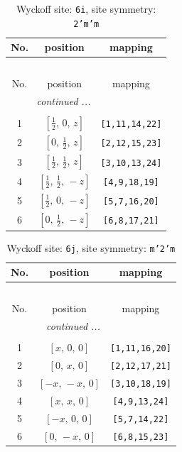 \documentclass[fleqn,8pt]{jsarticle}
\begin{document}
\renewcommand{\arraystretch}{1.2}
\begin{longtable}{ccc}
\caption{Wyckoff site: {\tt 6i}, site symmetry: {\tt 2'm'm}}
 \\
 \hline \hline
No. & position & mapping \\ \hline \endfirsthead

\multicolumn{2}{l}{\tablename\ \thetable{}} \\
 \hline \hline
No. & position & mapping \\ \hline \endhead

 \hline \hline
\multicolumn{2}{r}{\footnotesize\it continued ...} \\ \endfoot

 \hline \hline
\multicolumn{2}{r}{} \\ \endlastfoot

1 & $\left[ \frac{1}{2},\, 0,\, z \right]$ & {\tt [1,11,14,22]} \\ \hline
2 & $\left[ 0,\, \frac{1}{2},\, z \right]$ & {\tt [2,12,15,23]} \\ \hline
3 & $\left[ \frac{1}{2},\, \frac{1}{2},\, z \right]$ & {\tt [3,10,13,24]} \\ \hline
4 & $\left[ \frac{1}{2},\, \frac{1}{2},\, - z \right]$ & {\tt [4,9,18,19]} \\ \hline
5 & $\left[ \frac{1}{2},\, 0,\, - z \right]$ & {\tt [5,7,16,20]} \\ \hline
6 & $\left[ 0,\, \frac{1}{2},\, - z \right]$ & {\tt [6,8,17,21]} \\
\end{longtable}
\renewcommand{\arraystretch}{1.2}
\begin{longtable}{ccc}
\caption{Wyckoff site: {\tt 6j}, site symmetry: {\tt m'2'm}}
 \\
 \hline \hline
No. & position & mapping \\ \hline \endfirsthead

\multicolumn{2}{l}{\tablename\ \thetable{}} \\
 \hline \hline
No. & position & mapping \\ \hline \endhead

 \hline \hline
\multicolumn{2}{r}{\footnotesize\it continued ...} \\ \endfoot

 \hline \hline
\multicolumn{2}{r}{} \\ \endlastfoot

1 & $\left[ x,\, 0,\, 0 \right]$ & {\tt [1,11,16,20]} \\ \hline
2 & $\left[ 0,\, x,\, 0 \right]$ & {\tt [2,12,17,21]} \\ \hline
3 & $\left[ - x,\, - x,\, 0 \right]$ & {\tt [3,10,18,19]} \\ \hline
4 & $\left[ x,\, x,\, 0 \right]$ & {\tt [4,9,13,24]} \\ \hline
5 & $\left[ - x,\, 0,\, 0 \right]$ & {\tt [5,7,14,22]} \\ \hline
6 & $\left[ 0,\, - x,\, 0 \right]$ & {\tt [6,8,15,23]} \\
\end{longtable}
\end{document}
